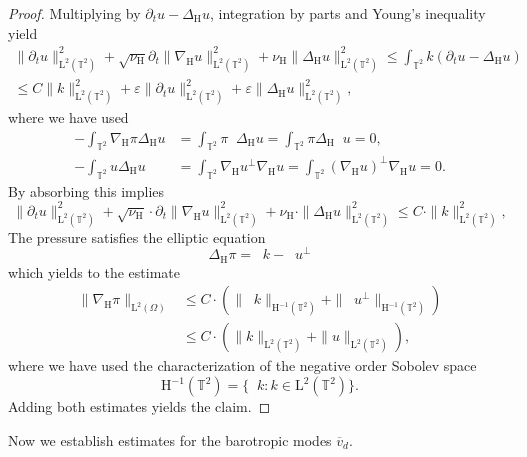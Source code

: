 \documentclass[preprint]{elsarticle}
\numberwithin{equation}{section}
\newcommand {\T}	{\mathbb{T}}
\DeclareMathOperator{\divH}{div_{\H}}
\renewcommand{\H}{\mathrm{H}}
\renewcommand{\bar}[1]{\overline{#1}}
\newcommand{\vbar}{\bar{v}}
\newcommand{\nablaH}{\nabla_{\H}}
\newcommand{\DeltaH}{\Delta_{\H}}
\newcommand{\rL}{\mathrm{L}}
\newcommand{\rH}{\H}
\begin{document}
\begin{proof}
	Multiplying by $\partial_t u - \DeltaH u$, integration by parts and Young's inequality yield
	\begin{align*}
		\| \partial_t u \|_{\rL^2(\T^2)}^2 
		+
		\sqrt{\nu_{\rH}}\partial_t \| \nablaH u \|_{\rL^2(\T^2)}^2
		+\nu_{\rH} \|\DeltaH u \|_{\rL^2(\T^2)}^2
		\leq \int_{\T^2} k (\partial_t u - \DeltaH u) \\
		\leq 
		C \| k \|_{\rL^2(\T^2)}^2
		+
		\varepsilon \| \partial_t u \|_{\rL^2(\T^2)}^2 
		+
		\varepsilon 
		\|\DeltaH u \|_{\rL^2(\T^2)}^2
		, 
	\end{align*}
	where we have used 
	\begin{align*}
		-\int_{\T^2} \nablaH \pi \DeltaH u
		&=  \int_{\T^2} \pi \divH \DeltaH u
		= \int_{\T^2} \pi \DeltaH \divH u
		= 0, \\
		-\int_{\T^2} u \DeltaH u 
		&= \int_{\T^2} \nablaH  u^\perp \nablaH u
		= \int_{\T^2} (\nablaH  u)^\perp \nablaH u
		= 0 . 
	\end{align*}
	By absorbing this implies 
	\begin{equation*}
		\| \partial_t u \|_{\rL^2(\T^2)}^2 
		+
		\sqrt{\nu_{\rH}}\cdot \partial_t \| \nablaH u \|_{\rL^2(\T^2)}^2
		+ \nu_{\rH}\cdot \|\DeltaH u \|_{\rL^2(\T^2)}^2
		\leq 
		C \cdot \| k \|_{\rL^2(\T^2)}^2
		, 
	\end{equation*}
	The pressure satisfies the elliptic equation
	\begin{equation*}
		\DeltaH \pi = \divH k - \divH u^\perp  
	\end{equation*}
	which yields to the estimate
	\begin{align*}
		\| \nablaH \pi \|_{\rL^2(\Omega)}
		&\leq C \cdot (\| \divH k \|_{\rH^{-1}(\T^2)}
		+ \| \divH u^\perp \|_{\rH^{-1}(\T^2)}) \\
		&\leq C \cdot (\| k \|_{\rL^2(\T^2)}
		+ \| u \|_{\rL^2(\T^2)}) ,
	\end{align*}
	where we have used the characterization of the negative order Sobolev space
	\begin{equation*}
		\rH^{-1}(\T^2) = \{ \divH k \colon k \in \rL^2(\T^2) \} .
	\end{equation*}
	Adding both estimates yields the claim. 
\end{proof}

Now we establish estimates for the barotropic modes $\vbar_d$.
\end{document}
